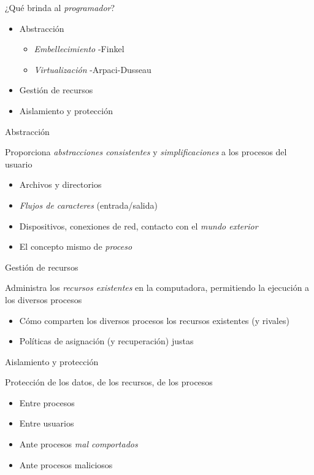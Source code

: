 \begin{frame}{¿Qué brinda al \emph{programador}?}
  \begin{itemize}
    \item Abstracción
        \begin{itemize}
          \item \emph{Embellecimiento} -Finkel
          \item \emph{Virtualización} -Arpaci-Dusseau
        \end{itemize}
    \item Gestión de recursos
    \item Aislamiento y protección
  \end{itemize}
\end{frame}

\begin{frame}{Abstracción}
  \begin{center}
    Proporciona \emph{abstracciones consistentes} y \emph{simplificaciones} a los
    procesos del usuario
  \end{center}
  \begin{itemize}
    \item Archivos y directorios
    \item \emph{Flujos de caracteres} (entrada/salida)
    \item Dispositivos, conexiones de red, contacto con el \emph{mundo exterior}
    \item El concepto mismo de \emph{proceso}
  \end{itemize}
\end{frame}

\begin{frame}{Gestión de recursos}
  \begin{center}
    Administra los \emph{recursos existentes} en la computadora, permitiendo la
    ejecución a los diversos procesos
  \end{center}
  \begin{itemize}
    \item Cómo comparten los diversos procesos los recursos existentes (y
          rivales)
    \item Políticas de asignación (y recuperación) justas
  \end{itemize}
\end{frame}

\begin{frame}{Aislamiento y protección}
  \begin{center}
      Protección de los datos, de los recursos, de los procesos
  \end{center}
  \begin{itemize}
    \item Entre procesos
    \item Entre usuarios
    \item Ante procesos \emph{mal comportados}
    \item Ante procesos maliciosos
  \end{itemize}
\end{frame}

